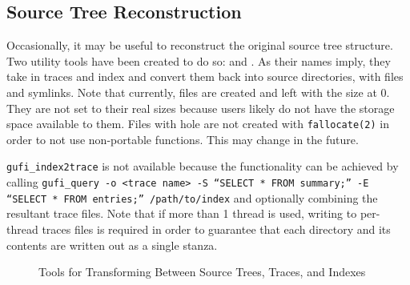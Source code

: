 \subsection{Source Tree Reconstruction}

Occasionally, it may be useful to reconstruct the original source tree
structure. Two utility tools have been created to do so: \gufitracedir
and \gufiindexdir. As their names imply, they take in traces and index
and convert them back into source directories, with files and
symlinks. Note that currently, files are created and left with the
size at 0. They are not set to their real sizes because users likely
do not have the storage space available to them. Files with hole are
not created with \texttt{fallocate(2)} in order to not use
non-portable functions. This may change in the future.

\texttt{gufi\_index2trace} is not available because the functionality
can be achieved by calling \texttt{gufi\_query -o <trace name> -S
  ``SELECT * FROM summary;'' -E ``SELECT * FROM entries;''
  /path/to/index} and optionally combining the resultant trace
files. Note that if more than 1 thread is used, writing to per-thread
traces files is required in order to guarantee that each
directory and its contents are written out as a single stanza.

\begin{figure}[H]
\centering
{}
\caption{Tools for Transforming Between Source Trees, Traces, and Indexes}
\end{figure}

